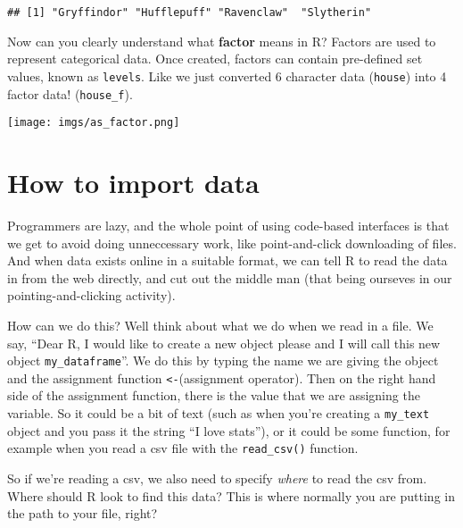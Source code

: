 \documentclass[
]{book}
\newenvironment{Shaded}{\begin{snugshade}}{\end{snugshade}}
\newcommand{\CommentTok}[1]{\textcolor[rgb]{0.56,0.35,0.01}{\textit{#1}}}
\newcommand{\FunctionTok}[1]{\textcolor[rgb]{0.13,0.29,0.53}{\textbf{#1}}}
\newcommand{\NormalTok}[1]{#1}
\newcommand{\SpecialCharTok}[1]{\textcolor[rgb]{0.81,0.36,0.00}{\textbf{#1}}}
\begin{document}
\begin{Shaded}
\end{Shaded}

\begin{verbatim}
## [1] "Gryffindor" "Hufflepuff" "Ravenclaw"  "Slytherin"
\end{verbatim}

Now can you clearly understand what \textbf{factor} means in R? Factors are used to represent categorical data. Once created, factors can contain pre-defined set values, known as \texttt{levels}. Like we just converted 6 character data (\texttt{house}) into 4 factor data! (\texttt{house\_f}).

\texttt{[image: imgs/as\_factor.png]}

\section{How to import data}\label{how-to-import-data}

Programmers are lazy, and the whole point of using code-based interfaces is that we get to avoid doing unneccessary work, like point-and-click downloading of files. And when data exists online in a suitable format, we can tell R to read the data in from the web directly, and cut out the middle man (that being ourseves in our pointing-and-clicking activity).

How can we do this? Well think about what we do when we read in a file. We say, ``Dear R, I would like to create a new object please and I will call this new object \texttt{my\_dataframe}''. We do this by typing the name we are giving the object and the assignment function \texttt{\textless{}-}(assignment operator). Then on the right hand side of the assignment function, there is the value that we are assigning the variable. So it could be a bit of text (such as when you're creating a \texttt{my\_text} object and you pass it the string ``I love stats''), or it could be some function, for example when you read a csv file with the \texttt{read\_csv()} function.

So if we're reading a csv, we also need to specify \emph{where} to read the csv from. Where should R look to find this data? This is where normally you are putting in the path to your file, right?
\end{document}

